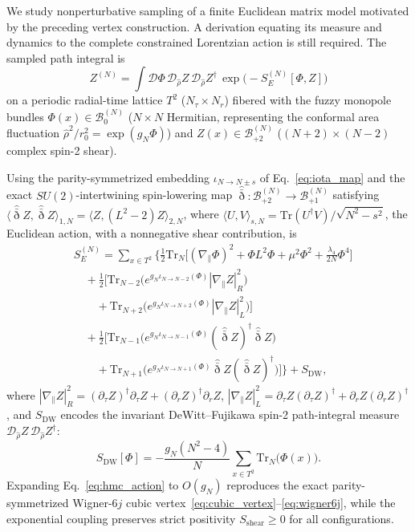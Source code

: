 \documentclass[onecolumn,11pt,aps,prd,amsmath,amssymb,nofootinbib,floatfix]{revtex4-2}
\newcommand{\calB}{\mathcal{B}}
\newcommand{\Tr}{\mathrm{Tr}}
\newcommand{\bareth}{\bar{\eth}}
\begin{document}
We study nonperturbative sampling of a finite Euclidean matrix model motivated by the preceding vertex construction. A derivation equating its measure and dynamics to the complete constrained Lorentzian action is still required. The sampled path integral is
\begin{equation}\label{eq:hmc_Z}
Z^{(N)} = \int \mathcal{D}\Phi\,\mathcal{D}_{\widehat{\rho}} Z\,\mathcal{D}_{\widehat{\rho}} Z^\dagger\,\exp\!\big(-S_E^{(N)}[\Phi,Z]\big)
\end{equation}
on a periodic radial-time lattice $T^2$ ($N_\tau\times N_r$) fibered with the fuzzy monopole bundles $\Phi(x)\in\calB_0^{(N)}$ ($N\times N$ Hermitian, representing the conformal area fluctuation $\widehat{\rho}^2/r_0^2=\exp(g_N\Phi)$) and $Z(x)\in\calB_{+2}^{(N)}$ ($(N+2)\times(N-2)$ complex spin-2 shear).

Using the parity-symmetrized embedding $\iota_{N\to N\pm s}$ of Eq.~\eqref{eq:iota_map} and the exact $SU(2)$-intertwining spin-lowering map $\widehat{\bareth}:\calB_{+2}^{(N)}\to\calB_{+1}^{(N)}$ satisfying $\langle\widehat{\bareth}Z,\widehat{\bareth}Z\rangle_{1,N}=\langle Z,(L^2-2)Z\rangle_{2,N}$, where $\langle U,V\rangle_{s,N}=\Tr(U^\dagger V)/\sqrt{N^2-s^2}$, the Euclidean action, with a nonnegative shear contribution, is
\begin{align}\label{eq:hmc_action}
&S_E^{(N)} = \sum_{x\in T^2}\Bigg\{\frac{1}{2}\Tr_N\!\Big[(\nabla_\parallel\Phi)^2 + \Phi L^2\Phi + \mu^2\Phi^2 + \tfrac{\lambda_4}{2N}\Phi^4\Big] \nonumber\\
&\quad + \frac{1}{2}\Big[\Tr_{N-2}\!\big(e^{g_N\iota_{N\to N-2}(\Phi)}|\nabla_\parallel Z|_R^2\big) \nonumber\\
&\qquad + \Tr_{N+2}\!\big(e^{g_N\iota_{N\to N+2}(\Phi)}|\nabla_\parallel Z|_L^2\big)\Big] \nonumber\\
&\quad + \frac{1}{2}\Big[\Tr_{N-1}\!\big(e^{g_N\iota_{N\to N-1}(\Phi)}(\widehat{\bareth}Z)^\dagger\widehat{\bareth}Z\big) \nonumber\\
&\qquad + \Tr_{N+1}\!\big(e^{g_N\iota_{N\to N+1}(\Phi)}\widehat{\bareth}Z(\widehat{\bareth}Z)^\dagger\big)\Big]\Bigg\} + S_{\mathrm{DW}},
\end{align}
where $|\nabla_\parallel Z|_R^2=(\partial_\tau Z)^\dagger\partial_\tau Z+(\partial_r Z)^\dagger\partial_r Z$, $|\nabla_\parallel Z|_L^2=\partial_\tau Z(\partial_\tau Z)^\dagger+\partial_r Z(\partial_r Z)^\dagger$, and $S_{\mathrm{DW}}$ encodes the invariant DeWitt--Fujikawa spin-2 path-integral measure $\mathcal{D}_{\widehat{\rho}}Z\,\mathcal{D}_{\widehat{\rho}}Z^\dagger$:
\begin{equation}\label{eq:dewitt_measure}
S_{\mathrm{DW}}[\Phi] = -\frac{g_N(N^2-4)}{N}\sum_{x\in T^2}\Tr_N\!\big(\Phi(x)\big).
\end{equation}
Expanding Eq.~\eqref{eq:hmc_action} to $O(g_N)$ reproduces the exact parity-symmetrized Wigner-$6j$ cubic vertex~\eqref{eq:cubic_vertex}--\eqref{eq:wigner6j}, while the exponential coupling preserves strict positivity $S_{\mathrm{shear}}\ge 0$ for all configurations.
\end{document}
